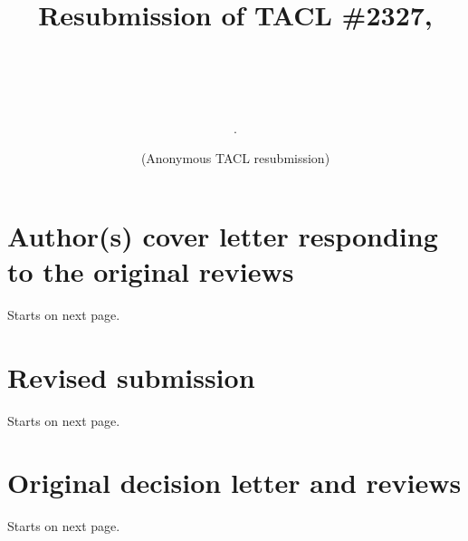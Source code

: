 \documentclass[11pt,a4paper]{article}
\title{Resubmission of TACL \#2327, \\ \subtitle.   \\}
\author{(Anonymous TACL resubmission)}
\newcommand{\coverfile}{rebuttal.pdf}  %
\newcommand{\resubmission}{multidomain.pdf}  %
\newcommand{\origdecision}{decision.pdf}  %
\begin{document}
\maketitle

\tableofcontents

\section{Author(s) cover letter responding to the original reviews} Starts on next page.

\section{Revised submission} Starts on next page.

\section{Original decision letter and reviews} Starts on next page.

\end{document}
